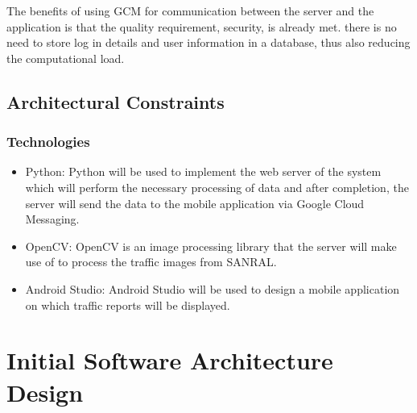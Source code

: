 \documentclass[a4paper,12pt]{article}
\begin{document}
The benefits of using GCM for communication between the server and the application is that the quality requirement, security, is already met. there is no need to store log in details and user information in a database, thus also reducing the computational load.

\subsection{Architectural Constraints}
\subsubsection{Technologies}
\begin{itemize}
\item Python: Python will be used to implement the web server of the system which will perform the necessary processing of data and after completion, the server will send the data to the mobile application via Google Cloud Messaging.
\item OpenCV: OpenCV is an image processing library that the server will make use of to process the traffic images from SANRAL.
\item Android Studio: Android Studio will be used to design a mobile application on which traffic reports will be displayed.
\end{itemize}
\section{Initial Software Architecture Design}
\end{document}
